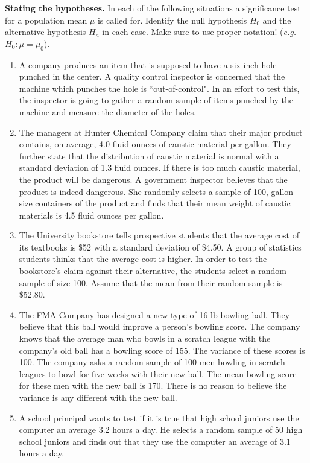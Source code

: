 \item \textbf{Stating the hypotheses.} In each of the following situations a significance test for a population mean $\mu$ is called for.  Identify the null hypothesis $H_0$ and the alternative hypothesis $H_a$ in each case. Make sure to use proper notation! (\textit{e.g. $H_0: \mu = \mu_0$}).
	\begin{enumerate}
	\item A company produces an item that is supposed to have a six inch hole punched in the center. A quality control inspector is concerned that the machine which punches the hole is ``out-of-control". In an effort to test this, the inspector is going to gather a random sample of items punched by the machine and measure the diameter of the holes.

	\item The managers at Hunter Chemical Company claim that their major product contains, on average, 4.0 fluid ounces of caustic material per gallon. They further state that the distribution of caustic material is normal with a standard deviation of 1.3 fluid ounces. If there is too much caustic material, the product will be dangerous. A government inspector believes that the product is indeed dangerous. She randomly selects a sample of 100, gallon-size containers of the product and finds that their mean weight of caustic materials is 4.5 fluid ounces per gallon.

	\item The University bookstore tells prospective students that the average cost of its textbooks is \$52 with a standard deviation of \$4.50. A group of statistics students thinks that the average cost is higher. In order to test the bookstore's claim against their alternative, the students select a random sample of size 100. Assume that the mean from their random sample is \$52.80.
	
	\item The FMA Company has designed a new type of 16 lb bowling ball. They believe that this ball would improve a person's bowling score. The company knows that the average man who bowls in a scratch league with the company's old ball has a bowling score of 155. The variance of these scores is 100. The company asks a random sample of 100 men bowling in scratch leagues to bowl for five weeks with their new ball. The mean bowling score for these men with the new ball is 170. There is no reason to believe the variance is any different with the new ball.
	
	\item A school principal wants to test if it is true that high school juniors use the computer an average 3.2 hours a day. He selects a random sample of 50 high school juniors and finds out that they use the computer an average of 3.1 hours a day.
	\end{enumerate}